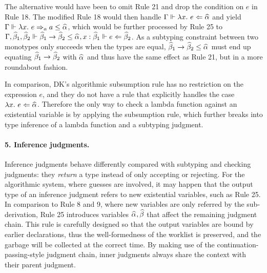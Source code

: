 The alternative would have been to omit Rule 21 and drop the condition on $e$
in Rule 18. The modified Rule 18 would then handle $\Gm \Vdash \lam e \Lto \al$
and yield $\Gm \Vdash \lam e \To_a a \le \al$, which would be further processed
by Rule 25 to $\Gm, \bt[1], \bt[2] \Vdash \bt[1] \to \bt[2] \le \al, x:\bt[1] \Vdash e \Lto \bt[2]$.
As a subtyping constraint between two monotypes only succeeds when the types are equal, $\bt[1] \to \bt[2] \le \al$
must end up equating $\bt[1] \to \bt[2]$ with $\al$ and thus have the same effect as Rule 21, but in a more roundabout
fashion.

In comparison,
DK's algorithmic subsumption rule has no restriction on the expression $e$,
and they do not have a rule that explicitly handles the case $\lam e \Lto \al$.
Therefore the only way to check a lambda function against an existential variable
is by applying the subsumption rule, which further breaks into
type inference of a lambda function and a subtyping judgment.
% 

\paragraph{\bf 5. Inference judgments.}
Inference judgments behave differently compared with subtyping and checking judgments:
they \emph{return} a type instead of only accepting or rejecting.
For the algorithmic system, where guesses are involved,
it may happen that the output type of an inference judgment refers to new existential variables,
such as Rule 25.
In comparison to Rule 8 and 9, where new variables are only referred by the sub-derivation,
Rule 25 introduces variables $\al, \bt$ that affect the remaining judgment chain.
This rule is carefully designed so that the output variables are bound by earlier declarations,
thus the well-formedness of the worklist is preserved,
and the garbage will be collected at the correct time.
By making use of the continuation-passing-style judgment chain,
inner judgments always share the context with their parent judgment.

